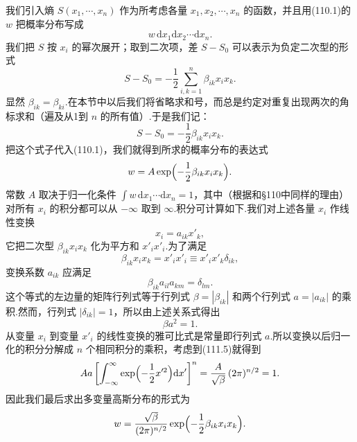 我们引入熵 $S(x_{1},\cdots,x_{n})$ 作为所考虑各量 $x_{1},x_{2},\cdots,x_{n}$ 的函数，并且用(110.1)的 $w$ 把概率分布写成
\begin{equation*}
  w\,\mathrm{d}x_{1}\mathrm{d}x_{2}\cdots\mathrm{d}x_{n}.
\end{equation*}
我们把 $S$ 按 $x_{i}$ 的幂次展开；取到二次项，差 $S-S_{0}$ 可以表示为负定二次型的形式
\begin{equation*}
  S-S_{0}=-\frac{1}{2}\sum_{i,k=1}^{n}\beta_{ik}x_{i}x_{k}.
\end{equation*}
显然 $\beta_{ik}=\beta_{ki}$.在本节中以后我们将省略求和号，而总是约定对重复出现两次的角标求和（遍及从1到 $n$ 的所有值）.于是我们记：
\begin{equation}
  S-S_{0}=-\frac{1}{2}\beta_{ik}x_{i}x_{k}.
\end{equation}
把这个式子代入(110.1)，我们就得到所求的概率分布的表达式
\begin{equation}
  w=A\exp\Bigl(-\frac{1}{2}\beta_{ik}x_{i}x_{k}\Bigr).
\end{equation}
常数 $A$ 取决于归一化条件 $\int w\,\mathrm{d}x_{1}\cdots\mathrm{d}x_{n}=1$，其中（根据和§110中同样的理由）对所有 $x_{i}$ 的积分都可以从 $-\infty$ 取到 $\infty$.积分可计算如下.我们对上述各量 $x_{i}$ 作线性变换
\begin{equation}
  x_{i}=a_{ik}x'_{k},
\end{equation}
它把二次型 $\beta_{ik}x_{i}x_{k}$ 化为平方和 $x'_{i}x'_{i}$.为了满足
\begin{equation*}
  \beta_{ik}x_{i}x_{k}=x'_{i}x'_{i}\equiv x'_{i}x'_{k}\delta_{ik},
\end{equation*}
变换系数 $a_{ik}$ 应满足
\begin{equation}
  \beta_{ik}a_{il}a_{km}=\delta_{lm}.
\end{equation}
这个等式的左边量的矩阵行列式等于行列式 $\beta=|\beta_{ik}|$ 和两个行列式 $a=|a_{ik}|$ 的乘积.然而，行列式 $|\delta_{ik}|=1$，所以由上述关系式得出
\begin{equation}
  \beta a^{2}=1.
\end{equation}
从变量 $x_{i}$ 到变量 $x'_{i}$ 的线性变换的雅可比式是常量即行列式 $a$.所以变换以后归一化的积分分解成 $n$ 个相同积分的乘积，考虑到(111.5)就得到
\begin{equation*}
  Aa\left[\int_{-\infty}^{\infty}
  \exp\Bigl(-\frac{1}{2}x^{\prime 2}\Bigr)\mathrm{d}x'\right]^{n}
  =\frac{A}{\sqrt{\beta}}\,(2\pi)^{n/2}=1.
\end{equation*}
因此我们最后求出多变量高斯分布的形式为
\begin{equation}
  w=\frac{\sqrt{\beta}}{(2\pi)^{n/2}}
  \exp\Bigl(-\frac{1}{2}\beta_{ik}x_{i}x_{k}\Bigr).
\end{equation}
